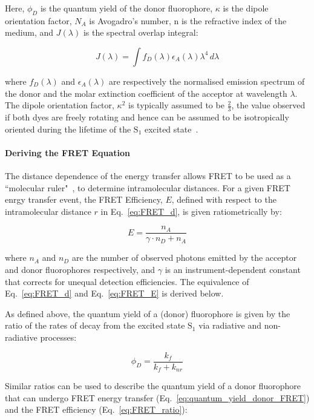 Here, $\phi_D$ is the quantum yield of the donor fluorophore, $\kappa$ is the dipole orientation factor, $N_A$ is Avogadro's number, n is the refractive index of the medium, and $J(\lambda)$ is the spectral overlap integral:

\begin{equation}
J(\lambda) = \int f_D(\lambda)\epsilon_A(\lambda)\lambda^4\,d\lambda
\label{eq:J}
\end{equation}

where $f_D(\lambda)$ and $\epsilon_A(\lambda)$ are respectively the normalised emission spectrum of the donor and the molar extinction coefficient of the acceptor at wavelength $\lambda$. The dipole orientation factor, $\kappa^2$ is typically assumed to be $\frac{2}{3}$, the value observed if both dyes are freely rotating and hence can be assumed to be isotropically oriented during the lifetime of the $\text{S}_1$ excited state~\cite{Demchenko2008}.

\paragraph{Deriving the FRET Equation}
The distance dependence of the energy transfer allows FRET to be used as a ``molecular ruler"~\cite{stryer67}, to determine intramolecular distances. For a given FRET enrgy transfer event, the FRET Efficiency, $E$, defined with respect to the intramolecular distance $r$ in Eq.~\ref{eq:FRET_d}, is given ratiometrically by:

\begin{equation}
E = \frac{n_A}{\gamma \cdot n_D + n_A}
\label{eq:FRET_E}
\end{equation}

where $n_A$ and $n_D$ are the number of observed photons emitted by the acceptor and donor fluorophores respectively, and $\gamma$ is an instrument-dependent constant that corrects for unequal detection efficiencies. The equivalence of Eq.~\ref{eq:FRET_d} and Eq.~\ref{eq:FRET_E} is derived below.

As defined above, the quantum yield of a (donor) fluorophore is given by the ratio of the rates of decay from the excited state $\text{S}_1$ via radiative and non-radiative processes: 

\begin{equation}
\phi_D = \frac{k_f}{k_f + k_{nr}}
\label{eq:quantum_yield_donor}
\end{equation}

Similar ratios can be used to describe the quantum yield of a donor fluorophore that can undergo FRET energy transfer (Eq.~\ref{eq:quantum_yield_donor_FRET}) and the FRET efficiency (Eq.~\ref{eq:FRET_ratio}):

